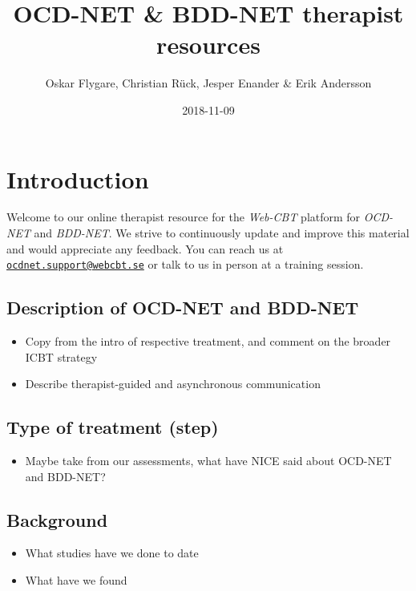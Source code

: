 \documentclass[]{book}
\title{OCD-NET \& BDD-NET therapist resources}
\author{Oskar Flygare, Christian Rück, Jesper Enander \& Erik Andersson}
\date{2018-11-09}
\providecommand{\tightlist}{%
  \setlength{\itemsep}{0pt}\setlength{\parskip}{0pt}}
\theoremstyle{definition}
\theoremstyle{definition}
\theoremstyle{definition}
\theoremstyle{remark}
\begin{document}
\maketitle

{
\setcounter{tocdepth}{1}
\tableofcontents
}
\hypertarget{introduction}{%
\chapter{Introduction}\label{introduction}}

Welcome to our online therapist resource for the \emph{Web-CBT} platform
for \emph{OCD-NET} and \emph{BDD-NET}. We strive to continuously update
and improve this material and would appreciate any feedback. You can
reach us at
\href{mailto:ocdnet.support@webcbt.se}{\nolinkurl{ocdnet.support@webcbt.se}}
or talk to us in person at a training session.

\hypertarget{description-of-ocd-net-and-bdd-net}{%
\section{Description of OCD-NET and
BDD-NET}\label{description-of-ocd-net-and-bdd-net}}

\begin{itemize}
\tightlist
\item
  Copy from the intro of respective treatment, and comment on the
  broader ICBT strategy
\item
  Describe therapist-guided and asynchronous communication
\end{itemize}

\hypertarget{type-of-treatment-step}{%
\section{Type of treatment (step)}\label{type-of-treatment-step}}

\begin{itemize}
\tightlist
\item
  Maybe take from our assessments, what have NICE said about OCD-NET and
  BDD-NET?
\end{itemize}

\hypertarget{background}{%
\section{Background}\label{background}}

\begin{itemize}
\tightlist
\item
  What studies have we done to date
\item
  What have we found
\end{itemize}
\end{document}
